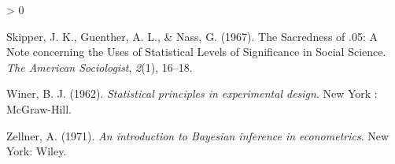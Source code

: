 \documentclass[
  english,
  ,jou, a4paper,floatsintext]{apa6}
\newlength{\cslhangindent}
\newenvironment{CSLReferences}[2] %
 {%
  \setlength{\parindent}{0pt}
  \ifodd #1 \everypar{\setlength{\hangindent}{\cslhangindent}}\ignorespaces\fi
  \ifnum #2 > 0
  \setlength{\parskip}{#2\baselineskip}
  \fi
 }%
 {}
\begin{document}
\begin{CSLReferences}{1}{0}
\leavevmode\hypertarget{ref-skipper_sacredness_1967}{}%
Skipper, J. K., Guenther, A. L., \& Nass, G. (1967). The {Sacredness} of .05: {A Note} concerning the {Uses} of {Statistical Levels} of {Significance} in {Social Science}. \emph{The American Sociologist}, \emph{2}(1), 16--18.

\leavevmode\hypertarget{ref-winer_statistical_1962}{}%
Winer, B. J. (1962). \emph{Statistical principles in experimental design}. {New York : McGraw-Hill}.

\leavevmode\hypertarget{ref-zellner_introduction_1971}{}%
Zellner, A. (1971). \emph{An introduction to {Bayesian} inference in econometrics}. {New York}: {Wiley}.

\end{CSLReferences}

\endgroup
\end{document}
